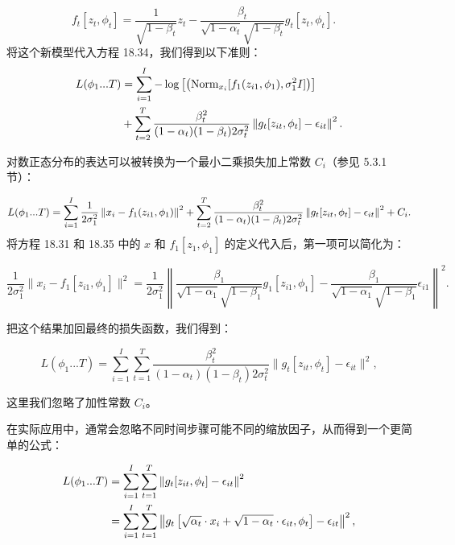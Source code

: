 \documentclass[lang=cn,newtx,10pt,scheme=chinese]{elegantbook}
\begin{document}
\begin{equation}
f_t[z_t, \phi_t] = \frac{1}{\sqrt{1 - \beta_t}}z_t - \frac{\beta_t}{\sqrt{1 - \alpha_t}\sqrt{1 - \beta_t}}g_t[z_t, \phi_t].
\quad 
\end{equation}
将这个新模型代入方程 18.34，我们得到以下准则：
\begin{align}
L(\phi_1...T) &= \sum_{i=1}^{I} -\log \left[  \left( \text{Norm}_{x_i} [f_1(z_{i1}, \phi_1), \sigma_1^2 I] \right) \right] \notag \\
&+ \sum_{t=2}^{T} \frac{\beta_t^2}{(1 - \alpha_t)(1 - \beta_t)2\sigma_t^2} \left\| g_t[z_{it}, \phi_t] - \epsilon_{it} \right\|^2 . 
\end{align}

对数正态分布的表达可以被转换为一个最小二乘损失加上常数 \(C_i\)（参见 5.3.1 节）：

\begin{equation}
L(\phi_1...T) = \sum_{i=1}^{I} \frac{1}{2\sigma_1^2} \left\| x_i - f_1(z_{i1}, \phi_1) \right\|^2 + \sum_{t=2}^{T} \frac{\beta_t^2}{(1 - \alpha_t)(1 - \beta_t)2\sigma_t^2} \left\| g_t[z_{it}, \phi_t] - \epsilon_{it} \right\|^2 + C_i. \notag
\end{equation}
将方程 18.31 和 18.35 中的 \(x\) 和 \(f_1[z_1, \phi_1]\) 的定义代入后，第一项可以简化为：

\begin{equation}
\frac{1}{2\sigma_1^2} \|x_i - f_1[z_{i1}, \phi_1]\|^2 = \frac{1}{2\sigma_1^2} \left\| \frac{\beta_1}{\sqrt{1 - \alpha_1}\sqrt{1 - \beta_1}} g_1[z_{i1}, \phi_1] - \frac{\beta_1}{\sqrt{1 - \alpha_1}\sqrt{1 - \beta_1}} \epsilon_{i1} \right\|^2. 
\end{equation}

把这个结果加回最终的损失函数，我们得到：

\begin{equation}
L(\phi_1...T) = \sum_{i=1}^{I} \sum_{t=1}^{T} \frac{\beta_t^2}{(1 - \alpha_t)(1 - \beta_t)2\sigma_t^2} \| g_t[z_{it}, \phi_t] - \epsilon_{it} \|^2, 
\end{equation}

这里我们忽略了加性常数 \(C_i\)。

在实际应用中，通常会忽略不同时间步骤可能不同的缩放因子，从而得到一个更简单的公式：


\begin{align}
L(\phi_1...T) &= \sum_{i=1}^{I} \sum_{t=1}^{T} \left\| g_t[z_{it}, \phi_t] - \epsilon_{it} \right\|^2 \notag \\
&= \sum_{i=1}^{I} \sum_{t=1}^{T} \left\| g_t \left[ \sqrt{\alpha_t} \cdot x_i + \sqrt{1 - \alpha_t} \cdot \epsilon_{it}, \phi_t \right] - \epsilon_{it} \right\|^2,  
\end{align} 
\end{document}
